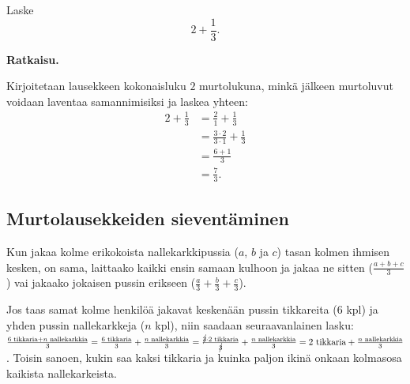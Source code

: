     \begin{esimerkki}
        Laske
        \[
            2 + \frac{1}{3}.
        \]
        
        \textbf{Ratkaisu.}
        
		Kirjoitetaan lausekkeen kokonaisluku $2$ murtolukuna, minkä
		jälkeen murtoluvut voidaan laventaa samannimisiksi
		ja laskea yhteen:
        \begin{align*}
           2 + \frac{1}{3} &= \frac{2}{1} + \frac{1}{3}  \\ 
	       				   &= \frac{3 \cdot 2}{3 \cdot 1} + \frac{1}{3} \\ 
	       				   &= \frac{6+1}{3} \\ 
	       				   &= \frac{7}{3}.
        \end{align*}
    \end{esimerkki}

    \subsection*{Murtolausekkeiden sieventäminen}


Kun jakaa kolme erikokoista nallekarkkipussia ($a$, $b$ ja $c$) tasan kolmen ihmisen kesken, on sama, laittaako kaikki ensin samaan kulhoon ja jakaa ne sitten ($\frac{a+b+c}{3}$) vai jakaako jokaisen pussin erikseen ($ \frac{a}{3} + \frac{b}{3} + \frac{c}{3}$).

Jos taas samat kolme henkilöä jakavat keskenään pussin tikkareita ($6$ kpl) ja yhden pussin nallekarkkeja ($n$ kpl), niin saadaan seuraavanlainen lasku: $ \frac{6\text{ tikkaria}+n\text{ nallekarkkia}}{3} = \frac{6\text{ tikkaria}}{3} + \frac{n\text{ nallekarkkia}}{3} = \frac{\cancel{3} \cdot 2\text{ tikkaria}}{\cancel{3}} + \frac{n\text{ nallekarkkia}}{3} = 2\text{ tikkaria} + \frac{n\text{ nallekarkkia}}{3}$. Toisin sanoen, kukin saa kaksi tikkaria ja kuinka paljon ikinä onkaan kolmasosa kaikista nallekarkeista.

